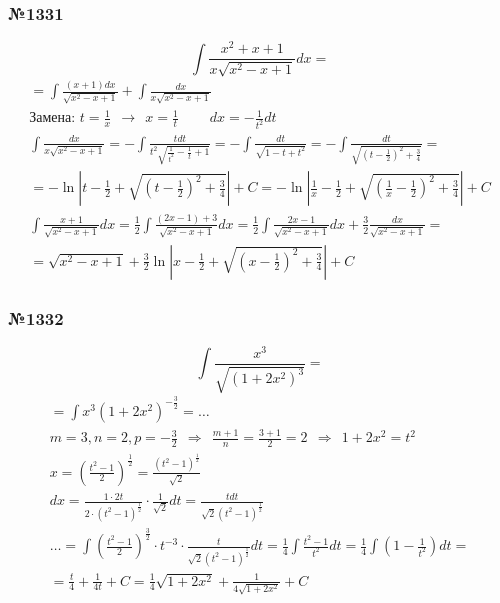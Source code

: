 \documentclass{article}
\begin{document}
\subsubsection{№1331}
\[
    \int \frac{x^2 + x + 1}{x \sqrt{x^2 - x + 1}} dx = 
\]
\begin{gather*}
    = \int \frac{(x + 1) dx}{\sqrt{x^2 - x + 1}} + \int \frac{dx}{x \sqrt{x^2 - x + 1}} \\
    \text{Замена: } t = \frac{1}{x} ~~\rightarrow~~ x = \frac{1}{t} ~~~~~~~~~~ dx = -\frac{1}{t^2} dt \\
    \int \frac{dx}{x \sqrt{x^2 - x + 1}} = 
    -\int \frac{tdt}{t^2 \sqrt{\frac{1}{t^2} - \frac{1}{t} + 1}} = 
    -\int \frac{dt}{\sqrt{1 - t + t^2}} =
    -\int \frac{dt}{\sqrt{\left(t - \frac{1}{2}\right)^2 + \frac{3}{4}}} = \\
    = -\ln \left| t - \frac{1}{2} + \sqrt{\left(t - \frac{1}{2}\right)^2 + \frac{3}{4}}\right| + C =
    -\ln \left|\frac{1}{x} - \frac{1}{2} + \sqrt{\left(\frac{1}{x} - \frac{1}{2}\right)^2 + \frac{3}{4}}\right| + C \\
    \int \frac{x + 1}{\sqrt{x^2 - x + 1}} dx = 
    \frac{1}{2} \int \frac{(2x - 1) + 3}{\sqrt{x^2 - x + 1}} dx =
    \frac{1}{2} \int \frac{2x - 1}{\sqrt{x^2 - x + 1}} dx + \frac{3}{2} \frac{dx}{\sqrt{x^2 - x + 1}} = \\
    = \sqrt{x^2 - x + 1} + \frac{3}{2} \ln \left|x - \frac{1}{2} + \sqrt{\left(x - \frac{1}{2}\right)^2 + \frac{3}{4}}\right| + C
\end{gather*}

\subsubsection{№1332}
\[
    \int \frac{x^3}{\sqrt{(1 + 2x^2)^3}} =
\]
\begin{gather*}
    = \int x^3 \left(1 + 2x^2\right)^{-\frac{3}{2}} = \dots \\
    m = 3, n = 2, p = -\frac{3}{2} ~~\Rightarrow~~ \frac{m + 1}{n} = \frac{3 + 1}{2} = 2 ~~\Rightarrow~~ 1 + 2x^2 = t^2 \\
    x = \left(\frac{t^2 - 1}{2}\right)^{\frac{1}{2}} = \frac{\left(t^2 - 1\right)^{\frac{1}{2}}}{\sqrt{2}} \\
    dx = \frac{1 \cdot 2t}{2 \cdot (t^2 - 1)^{\frac{1}{2}}} \cdot \frac{1}{\sqrt{2}} dt = \frac{tdt}{\sqrt{2} (t^2 - 1)^{\frac{1}{2}}} \\
    \dots = \int \left(\frac{t^2 - 1}{2}\right)^{\frac{3}{2}} \cdot t^{-3} \cdot \frac{t}{\sqrt{2}(t^2 - 1)^{\frac{1}{2}}} dt =
    \frac{1}{4} \int \frac{t^2 - 1}{t^2} dt =
    \frac{1}{4} \int \left(1 - \frac{1}{t^2}\right) dt = \\
    = \frac{t}{4} + \frac{1}{4t} + C = 
    \frac{1}{4} \sqrt{1 + 2x^2} + \frac{1}{4 \sqrt{1 + 2x^2}} + C
\end{gather*}
\end{document}
